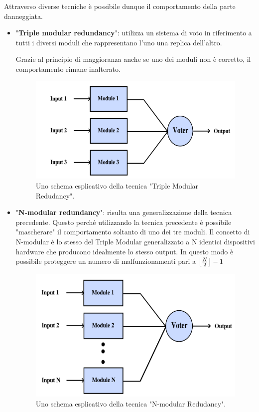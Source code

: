 \documentclass[LaM,binding=0.6cm]{../sapthesis}
\DeclarePairedDelimiter\floor{\lfloor}{\rfloor}
\begin{document}
Attraverso diverse tecniche è possibile dunque il comportamento della parte danneggiata.

\begin{itemize}
    \item "\textbf{Triple modular redundancy}": utilizza un sistema di voto in riferimento a tutti i diversi moduli che rappresentano l'uno una replica dell'altro. 
    
    Grazie al principio di maggioranza anche se uno dei moduli non è corretto, il comportamento rimane inalterato.
    
    \begin{figure}[htbp]
    \centerline{\includegraphics[scale=.67]{examples/TripleRedudancy.PNG}}
    \caption{Uno schema esplicativo della tecnica "Triple Modular Redudancy".}
    \label{fig}
    \end{figure}
\newline
    
    \item "\textbf{N-modular redundancy}": risulta una generalizzazione della tecnica precedente. Questo perché utilizzando la tecnica precedente è possibile "mascherare" il comportamento soltanto di uno dei tre moduli. Il concetto di N-modular è lo stesso del Triple Modular generalizzato a N identici dispositivi hardware che producono idealmente lo stesso output. In questo modo è possibile proteggere un numero di malfunzionamenti pari a $\floor*{\frac{N}{2}}-1$
    
    \begin{figure}[htbp]
    \centerline{\includegraphics[scale=.67]{examples/NModularRedudancy.PNG}}
    \caption{Uno schema esplicativo della tecnica "N-modular Redudancy".}
    \label{fig}
    \end{figure}
\newline
\end{itemize}
\end{document}
